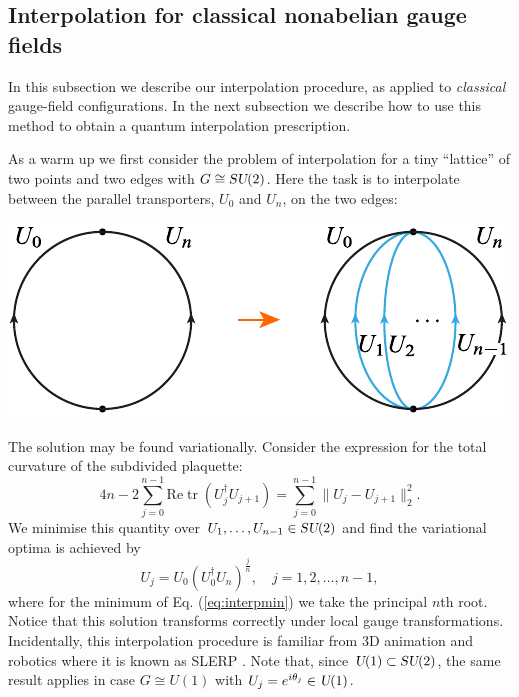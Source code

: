 \documentclass[twocolumn,lengthcheck,superscriptaddress]{revtex4-1}
\newcommand{\tr}{\operatorname{tr}}
\def\su2{\textsl{SU}(2)}
\def\uone{\textsl{U}(1)}
\theoremstyle{definition}
\theoremstyle{remark}
\begin{document}
\subsection{Interpolation for classical nonabelian gauge fields}
In this subsection we describe our interpolation procedure, as applied to \emph{classical} gauge-field configurations. In the next subsection we describe how to use this method to obtain a quantum interpolation prescription.

As a warm up we first consider the problem of interpolation for a tiny ``lattice'' of two points and two edges with $G \cong \su2$. Here the task is to interpolate between the parallel transporters, $U_0$ and $U_n$, on the two edges:
\begin{center}
	\includegraphics{facemsection.pdf}
\end{center}
The solution may be  found variationally. Consider the expression for the total curvature of the subdivided plaquette:
\begin{equation} \label{eq:interpmin}
 4n- 2 \sum_{j=0}^{n-1}  \text{Re}\tr(U_j^\dag U_{j+1}) 
	=  \sum_{j=0}^{n-1} \|U_j-U_{j+1}\|_2^2 .
\end{equation}
We minimise this quantity over ${U_1, \ldots, U_{n-1} \in \su2}$ and find the variational optima is achieved by
\begin{equation} \label{eq:slerp}
	U_j = U_0 (U_0^\dag U_{n})^{\frac{j}{n}}, \quad j = 1, 2, \ldots, n-1,
\end{equation}
where for the minimum of Eq. (\ref{eq:interpmin}) we take the principal $n$th root.
Notice that this solution transforms correctly under local gauge transformations. Incidentally, this interpolation procedure is familiar from 3D animation and robotics where it is known as SLERP \cite{shoemake:1985a}. 
Note that, since $\uone \subset \su2$, the same result applies in case $G \cong U(1)$ with $U_j = e^{i\theta_j} \in \uone$. 
\end{document}
